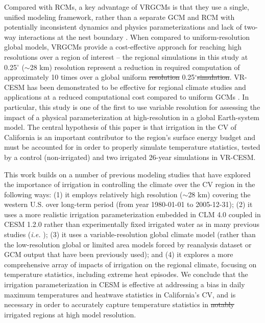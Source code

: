 \documentclass[draft,ms]{agutex}   %
\providecommand{\DIFadd}[1]{{\protect\color{blue}\uwave{#1}}} %
\providecommand{\DIFdel}[1]{{\protect\color{red}\sout{#1}}}                      %
\providecommand{\DIFaddbegin}{} %
\providecommand{\DIFaddend}{} %
\providecommand{\DIFdelbegin}{} %
\providecommand{\DIFdelend}{} %
\begin{document}
\begin{article}
Compared with RCMs, a key advantage of VRGCMs is that they use a single, unified modeling framework, rather than a separate GCM and RCM with potentially inconsistent dynamics and physics parameterizations and lack of two-way interactions at the nest boundary \citep{laprise2008challenging}. When compared to uniform-resolution global models, VRGCMs provide a cost-effective approach for reaching high resolutions over a region of interest -- the regional simulations in this study at 0.25$^\circ$ ($\sim$28 km) resolution represent a reduction in required computation of approximately 10 times over a global uniform \DIFdelbegin \DIFdel{resolution }\DIFdelend \DIFaddbegin \DIFadd{simulation with resolution of }\DIFaddend 0.25$^\circ$\DIFdelbegin \DIFdel{simulation}\DIFdelend . VR-CESM has been demonstrated to be effective for regional climate studies and applications at a reduced computational cost compared to uniform GCMs \citep{zarzycki2015effects, rhoades2015characterizing, huang2016evaluation}. In particular, this study is one of the first to use variable resolution for assessing the impact of a physical parameterization at high-resolution in a global Earth-system model. The central hypothesis of this paper is that irrigation in the CV of California is an important contributor to the region's surface energy budget and must be accounted for in order to properly simulate temperature statistics, tested by a control (non-irrigated) and two irrigated 26-year simulations in VR-CESM.

This work builds on a number of previous modeling studies that have explored the importance of irrigation in controlling the climate over the CV region in the following ways: (1) it employs relatively high resolution ($\sim$28 km) covering the western U.S. over long-term period  (from year 1980-01-01 to 2005-12-31); (2) it uses a more realistic irrigation parameterization embedded in CLM 4.0 coupled in CESM 1.2.0 rather than experimentally fixed irrigated water as in many previous studies (\textit{i.e.} \cite{lobell2006biogeophysical, lo2013irrigation}); (3) it uses a variable-resolution global climate model (rather than the low-resolution global or limited area models forced by reanalysis dataset or GCM output that have been previously used); and (4) it explores a more comprehensive array of impacts of irrigation on the regional climate, focusing on temperature statistics, including extreme heat episodes.  We conclude that the irrigation parameterization in CESM is effective at addressing a bias in daily maximum temperatures and heatwave statistics in California's CV, and is necessary in order to accurately capture temperature statistics in \DIFdelbegin \DIFdel{notably }\DIFdelend \DIFaddbegin \DIFadd{heavily }\DIFaddend irrigated regions at high model resolution.


\end{article}
\end{document}
